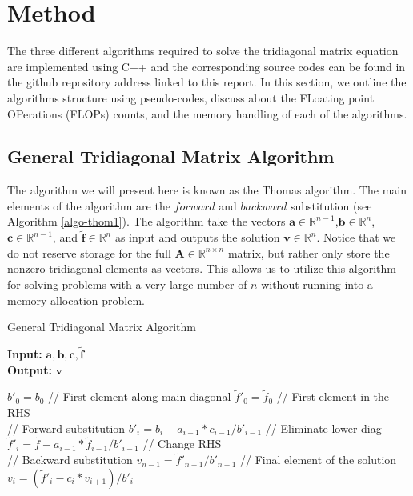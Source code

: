 \documentclass[a4paper]{article}
\begin{document}
\section{Method}
The three different algorithms required to solve the tridiagonal matrix equation are implemented using C++ and the corresponding source codes can be found in the github repository address linked to this report. In this section, we outline the algorithms structure using pseudo-codes, discuss about the FLoating point OPerations (FLOPs) counts, and the memory handling of each of the algorithms.  
 
\subsection{General Tridiagonal Matrix Algorithm}
The algorithm we will present here is known as the Thomas algorithm. The main elements of the algorithm are the $forward$ and $backward$ substitution (see Algorithm \eqref{algo-thom1}). The algorithm take the vectors $\mathbf{a}\in\mathbb{R}^{n-1}$,$\mathbf{b}\in\mathbb{R}^{n}$,$\mathbf{c}\in\mathbb{R}^{n-1}$, and $\mathbf{\tilde{f}}\in\mathbb{R}^{n}$ as input and outputs the solution $\mathbf{v}\in\mathbb{R}^{n}$. Notice that we do not reserve storage for the full $\mathbf{A}\in\mathbb{R}^{n\times n}$ matrix, but rather only store the nonzero tridiagonal elements as vectors. This allows us to utilize this algorithm for solving problems with a very large number of $n$ without running into a memory allocation problem.

\begin{algorithm}[H]
\caption{General Tridiagonal Matrix Algorithm}\label{algo-thom1}
\textbf{Input:} $\mathbf{a}, \mathbf{b},\mathbf{c},\mathbf{\tilde{f}}$ \\
\textbf{Output:} $\mathbf{v}$
\begin{algorithmic}[1]
\State $b'_0=b_0$ \qquad// First element along main diagonal
\State $\tilde{f}'_0=\tilde{f}_0$ \qquad// First element in the RHS\\
    \State // Forward substitution
		\State $b'_i=b_i-a_{i-1}*c_{i-1}/b'_{i-1}$	\qquad// Eliminate lower diag	  
		\State $\tilde{f}'_i=\tilde{f}-a_{i-1}*\tilde{f}_{i-1}/b'_{i-1}$  \qquad// Change RHS
	\EndFor \\
    
    \State // Backward substitution
    \State $v_{n-1}=\tilde{f}'_{n-1}/b'_{n-1}$ \qquad\qquad// Final element of the solution\\
		\State $v_i=(\tilde{f}'_{i}-c_i*v_{i+1})/b'_i$ 
	\EndFor 
\end{algorithmic}
\end{algorithm}
\end{document}
